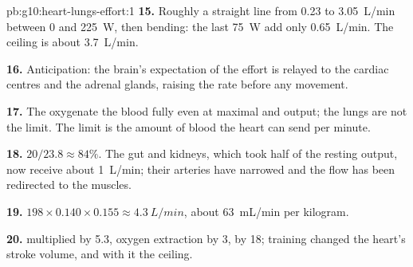 \begin{solution}{pb:g10:heart-lungs-effort:1}
\textbf{15.} Roughly a straight line from \num{0.23} to
\qty{3.05}{L/min} between 0 and \qty{225}{W}, then bending: the last
\qty{75}{W} add only \qty{0.65}{L/min}. The ceiling is about
\qty{3.7}{L/min}.

\textbf{16.} Anticipation: the brain's expectation of the effort is
relayed to the cardiac centres and the adrenal glands, raising the
rate before any movement.

\textbf{17.} The  oxygenate the blood fully even at maximal
 and output; the lungs are not the limit. The limit is the
amount of blood the heart can send per minute.

\textbf{18.} $20/23.8 \approx 84\%$. The gut and kidneys, which took
half of the resting output, now receive about \qty{1}{L/min}; their
arteries have narrowed and the flow has been redirected to the
muscles.

\textbf{19.} $198 \times 0.140 \times 0.155 \approx \qty{4.3}{L/min}$,
about \qty{63}{mL/min} per kilogram.

\textbf{20.}  multiplied by 5.3, oxygen extraction by 3,
 by 18; training changed the heart's stroke volume, and
with it the ceiling.
\end{solution}
